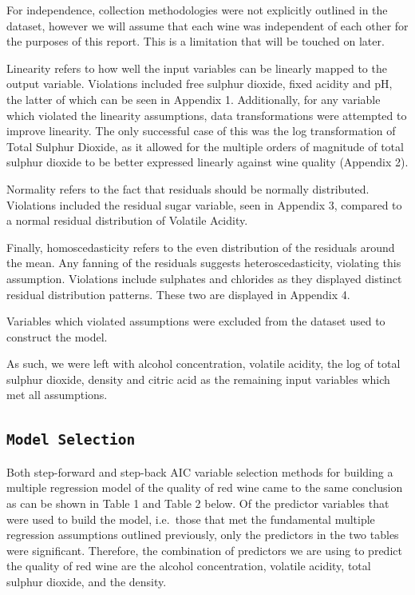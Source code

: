 \documentclass[letterpaper,8pt,twocolumn,twoside,]{pinp}
\begin{document}
For independence, collection methodologies were not explicitly outlined
in the dataset, however we will assume that each wine was independent of
each other for the purposes of this report. This is a limitation that
will be touched on later.

Linearity refers to how well the input variables can be linearly mapped
to the output variable. Violations included free sulphur dioxide, fixed
acidity and pH, the latter of which can be seen in Appendix 1.
Additionally, for any variable which violated the linearity assumptions,
data transformations were attempted to improve linearity. The only
successful case of this was the log transformation of Total Sulphur
Dioxide, as it allowed for the multiple orders of magnitude of total
sulphur dioxide to be better expressed linearly against wine quality
(Appendix 2).

Normality refers to the fact that residuals should be normally
distributed. Violations included the residual sugar variable, seen in
Appendix 3, compared to a normal residual distribution of Volatile
Acidity.

Finally, homoscedasticity refers to the even distribution of the
residuals around the mean. Any fanning of the residuals suggests
heteroscedasticity, violating this assumption. Violations include
sulphates and chlorides as they displayed distinct residual distribution
patterns. These two are displayed in Appendix 4.

Variables which violated assumptions were excluded from the dataset used
to construct the model.

As such, we were left with alcohol concentration, volatile acidity, the
log of total sulphur dioxide, density and citric acid as the remaining
input variables which met all assumptions.

\hypertarget{model-selection}{%
\subsection{\texorpdfstring{\texttt{Model\ Selection}}{Model Selection}}\label{model-selection}}

Both step-forward and step-back AIC variable selection methods for
building a multiple regression model of the quality of red wine came to
the same conclusion as can be shown in Table 1 and Table 2 below. Of the
predictor variables that were used to build the model, i.e.~those that
met the fundamental multiple regression assumptions outlined previously,
only the predictors in the two tables were significant. Therefore, the
combination of predictors we are using to predict the quality of red
wine are the alcohol concentration, volatile acidity, total sulphur
dioxide, and the density.
\end{document}
